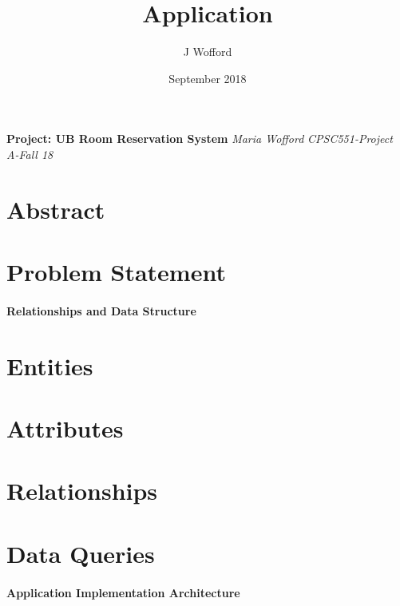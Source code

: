 \documentclass[11pt]{report}
\title{Application}
\author{J Wofford}
\date{September 2018}
\begin{document}

\begin{titlepage}
   \begin{center}
      \Large\textbf{Project: UB Room Reservation System}
      \large\textit{Maria Wofford}
      \large\textit{CPSC551-Project A-Fall 18}
   \end{center}
\end{titlepage}

\section*{Abstract}

\section*{Problem Statement}

\paragraph{Relationships and Data Structure}

\section*{Entities}
\section*{Attributes}
\section*{Relationships}
\section*{Data Queries}
\paragraph{Application Implementation Architecture}
\end{document}
